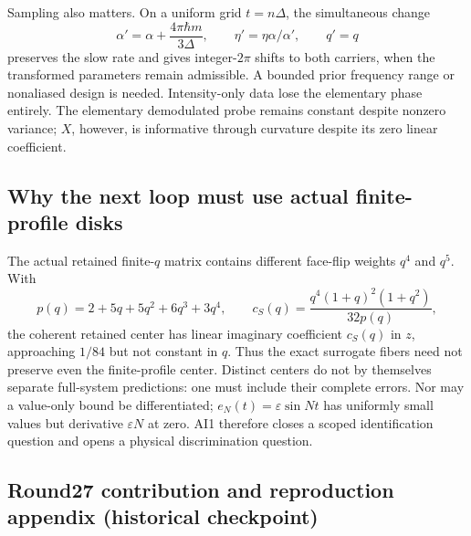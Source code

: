 Sampling also matters. On a uniform grid $t=n\Delta$, the simultaneous change
\begin{equation}
\alpha'=\alpha+\frac{4\pi\hbar m}{3\Delta},\qquad
\eta'=\eta\alpha/\alpha',\qquad q'=q
\label{r27:eq:alias}
\end{equation}
preserves the slow rate and gives integer-$2\pi$ shifts to both carriers, when the transformed parameters remain admissible. A bounded prior frequency range or nonaliased design is needed. Intensity-only data lose the elementary phase entirely. The elementary demodulated probe remains constant despite nonzero variance; $X$, however, is informative through curvature despite its zero linear coefficient.

\subsection{Why the next loop must use actual finite-profile disks}
The actual retained finite-$q$ matrix contains different face-flip weights $q^4$ and $q^5$. With
\begin{equation}
p(q)=2+5q+5q^2+6q^3+3q^4,\qquad
c_S(q)=\frac{q^4(1+q)^2(1+q^2)}{32p(q)},
\label{r27:eq:slope}
\end{equation}
the coherent retained center has linear imaginary coefficient $c_S(q)$ in $z$, approaching $1/84$ but not constant in $q$. Thus the exact surrogate fibers need not preserve even the finite-profile center. Distinct centers do not by themselves separate full-system predictions: one must include their complete errors. Nor may a value-only bound be differentiated; $e_N(t)=\varepsilon\sin Nt$ has uniformly small values but derivative $\varepsilon N$ at zero. AI1 therefore closes a scoped identification question and opens a physical discrimination question.



\clearpage
\subsection*{Round27 contribution and reproduction appendix (historical checkpoint)}


